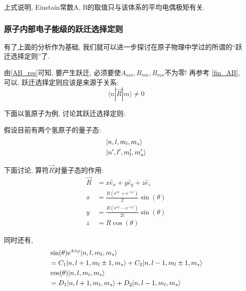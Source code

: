 \documentclass[a4paper, 11pt]{article}
\begin{document}
\begin{spacing}{1.2}
          上式说明, Einstain常数A, B的取值只与该体系的平均电偶极矩有关.

        \subsubsection{原子内部电子能级的跃迁选择定则}
          有了上面的分析作为基础, 我们就可以进一步探讨在原子物理中学过的所谓的``跃迁选择定则''了.

          由\eqref{AB_res}可知, 要产生跃迁, 必须要使$A_{nm}, B_{nm}, B_{mn}$不为零! 再参考
          \eqref{fin_AB}, 可以, 跃迁选择定则应该是来源于关系:
          \begin{equation}
            \label{transition_request}
            \langle{}n|\vec{R}|m\rangle \ne 0
          \end{equation}

          下面以氢原子为例, 讨论其跃迁选择定则:

          假设目前有两个氢原子的量子态:
          \begin{equation}
            \begin{aligned}
              &|n,l,m_l,m_s\rangle\\
              &|n',l',m_l',m_s'\rangle \notag
            \end{aligned}
          \end{equation}

          下面讨论, 算符$\vec{R}$对量子态的作用:
          \begin{subequations}
            \label{rxyz}
            \begin{align}
              \vec{R} &= x\hat{e}_x + y\hat{e}_y + z\hat{e}_z\\
                    x &= \frac{R(\mathrm{e}^{i\varphi}+\mathrm{e}^{-i\varphi})}{2}\sin(\theta)\\
                    y &= \frac{R(\mathrm{e}^{i\varphi}-\mathrm{e}^{-i\varphi})}{2i}\sin(\theta)\\
                    z &= R\cos(\theta)
            \end{align}
          \end{subequations}
          
          同时还有, 
          \begin{subequations}
            \label{sincos_H}
            \begin{align}
              &\sin(\theta)\mathrm{e}^{\pm{}i\varphi}|n,l,m_l,m_s\rangle \notag\\
              &= C_1|n,l+1,m_l\pm1,m_s\rangle + C_2|n,l-1,m_l\pm1,m_s\rangle\\
              &\cos(\theta)|n,l,m_l,m_s\rangle \notag \\
              &= D_1|n,l+1,m_l,m_s\rangle + D_2|n,l-1,m_l,m_s\rangle
            \end{align}
          \end{subequations}


\end{spacing}
\end{document}
